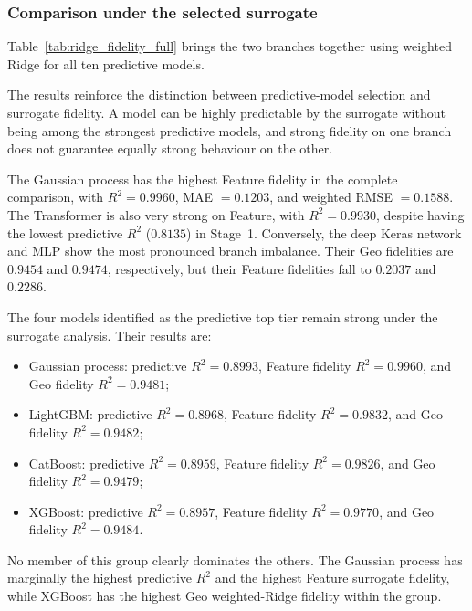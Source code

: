 \subsubsection{Comparison under the selected surrogate}
\label{sec}

Table~\ref{tab:ridge_fidelity_full} brings the two branches together using weighted Ridge for all ten predictive models.

The results reinforce the distinction between predictive-model selection and surrogate fidelity. A model can be highly predictable by the surrogate without being among the strongest predictive models, and strong fidelity on one branch does not guarantee equally strong behaviour on the other.

The Gaussian process has the highest Feature fidelity in the complete comparison, with $R^2=0.9960$, MAE $=0.1203$, and weighted RMSE $=0.1588$. The Transformer is also very strong on Feature, with $R^2=0.9930$, despite having the lowest predictive $R^2$ ($0.8135$) in Stage~1. Conversely, the deep Keras network and MLP show the most pronounced branch imbalance. Their Geo fidelities are $0.9454$ and $0.9474$, respectively, but their Feature fidelities fall to $0.2037$ and $0.2286$.

The four models identified as the predictive top tier remain strong under the surrogate analysis. Their results are:

\begin{itemize}

\item Gaussian process: predictive $R^2=0.8993$, Feature fidelity $R^2=0.9960$, and Geo fidelity $R^2=0.9481$;

\item LightGBM: predictive $R^2=0.8968$, Feature fidelity $R^2=0.9832$, and Geo fidelity $R^2=0.9482$;

\item CatBoost: predictive $R^2=0.8959$, Feature fidelity $R^2=0.9826$, and Geo fidelity $R^2=0.9479$;

\item XGBoost: predictive $R^2=0.8957$, Feature fidelity $R^2=0.9770$, and Geo fidelity $R^2=0.9484$.

\end{itemize}

No member of this group clearly dominates the others. The Gaussian process has marginally the highest predictive $R^2$ and the highest Feature surrogate fidelity, while XGBoost has the highest Geo weighted-Ridge fidelity within the group.

